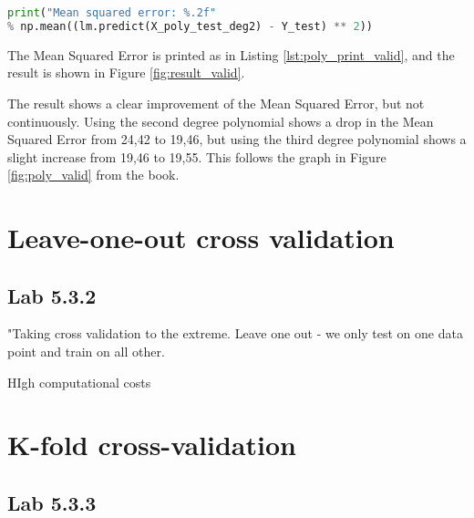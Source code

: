 \begin{lstlisting}[language=Python, label=lst:poly_print_valid, caption=Printing polynomial features with degree = 2]
print("Mean squared error: %.2f" 
% np.mean((lm.predict(X_poly_test_deg2) - Y_test) ** 2))
\end{lstlisting}

The Mean Squared Error is printed as in Listing \ref{lst:poly_print_valid}, and the result is shown in Figure \ref{fig:result_valid}.


The result shows a clear improvement of the Mean Squared Error, but not continuously. Using the second degree polynomial shows a drop in the Mean Squared Error from 24,42 to 19,46, but using the third degree polynomial shows a slight increase from 19,46 to 19,55. This follows the graph in Figure \ref{fig:poly_valid} from the book. 

\section{Leave-one-out cross validation}


\subsection{Lab 5.3.2}
"Taking cross validation to the extreme. Leave one out - we only test on one data point and train on all other.

HIgh computational costs


\section{K-fold cross-validation}


\subsection{Lab 5.3.3}